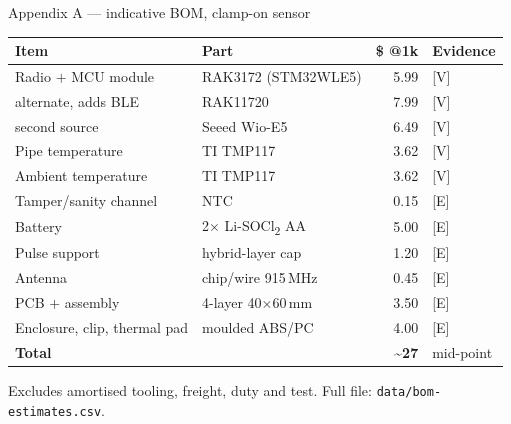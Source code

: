 \documentclass[aspectratio=169,t,10pt,xcolor={table,svgnames}]{beamer}
\newcommand{\hd}[1]{\textbf{\footnotesize #1}}
\begin{document}
\appendix
\begin{frame}{Appendix A --- indicative BOM, clamp-on sensor}
  \scriptsize
  \begin{tabular}{@{}p{}p{}rp{}@{}}
    \toprule
    \hd{Item} & \hd{Part} & \hd{\$ @1k} & \hd{Evidence} \\
    \midrule
    Radio $+$ MCU module          & RAK3172 (STM32WLE5) & 5.99 & [V] \\
    \quad alternate, adds BLE     & RAK11720            & 7.99 & [V] \\
    \quad second source           & Seeed Wio-E5        & 6.49 & [V] \\
    Pipe temperature              & TI TMP117           & 3.62 & [V] \\
    Ambient temperature           & TI TMP117           & 3.62 & [V] \\
    Tamper/sanity channel         & NTC                 & 0.15 & [E] \\
    Battery                       & 2$\times$ Li-SOCl\textsubscript{2} AA & 5.00 & [E] \\
    Pulse support                 & hybrid-layer cap    & 1.20 & [E] \\
    Antenna                       & chip/wire 915\,MHz  & 0.45 & [E] \\
    PCB $+$ assembly              & 4-layer 40$\times$60\,mm & 3.50 & [E] \\
    Enclosure, clip, thermal pad  & moulded ABS/PC      & 4.00 & [E] \\
    \midrule
    \textbf{Total}                &                     & \textbf{\textasciitilde27} & mid-point \\
    \bottomrule
  \end{tabular}
  \vspace{0.5em}
  {\scriptsize Excludes amortised tooling, freight, duty and test. Full file:
   \texttt{data/bom-estimates.csv}.\par}
\end{frame}
\end{document}
